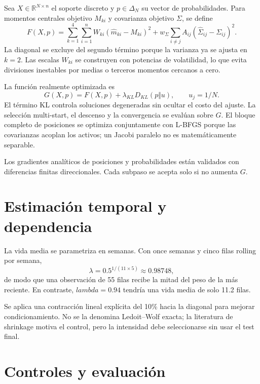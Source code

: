 \documentclass[11pt,letterpaper]{article}
\begin{document}
Sea $X\in\mathbb{R}^{N\times n}$ el soporte discreto y
$p\in\Delta_N$ su vector de probabilidades. Para momentos centrales objetivo
$M_{ki}$ y covarianza objetivo $\Sigma$, se define
\begin{equation}
 F(X,p)=\sum_{k=1}^{4}\sum_{i=1}^{n}W_{ki}
 \left(\widehat m_{ki}-M_{ki}\right)^2
 +w_\Sigma\sum_{i\ne j}A_{ij}
 \left(\widehat\Sigma_{ij}-\Sigma_{ij}\right)^2.
\end{equation}
La diagonal se excluye del segundo término porque la varianza ya se ajusta en
$k=2$. Las escalas $W_{ki}$ se construyen con potencias de volatilidad, lo que evita
divisiones inestables por medias o terceros momentos cercanos a cero.

La función realmente optimizada es
\begin{equation}
 G(X,p)=F(X,p)+\lambda_{KL}D_{KL}(p\Vert u),
 \qquad u_j=1/N.
\end{equation}
El término KL controla soluciones degeneradas sin ocultar el costo del ajuste. La
selección multi-start, el descenso y la convergencia se evalúan sobre $G$. El bloque
completo de posiciones se optimiza conjuntamente con L-BFGS porque las covarianzas
acoplan los activos; un Jacobi paralelo no es matemáticamente separable.

Los gradientes analíticos de posiciones y probabilidades están validados con
diferencias finitas direccionales. Cada subpaso se acepta solo si no aumenta $G$.

\section{Estimación temporal y dependencia}

La vida media se parametriza en semanas. Con once semanas y cinco filas rolling por
semana,
\begin{equation}
 \lambda=0.5^{1/(11\times5)}\approx0.98748,
\end{equation}
de modo que una observación de 55 filas recibe la mitad del peso de la más reciente.
En contraste, $lambda=0.94$ tendría una vida media de solo 11.2 filas.

Se aplica una contracción lineal explícita del 10\% hacia la diagonal para mejorar
condicionamiento. No se la denomina Ledoit--Wolf exacta; la literatura de shrinkage
\cite{ledoitwolf2004} motiva el control, pero la intensidad debe seleccionarse sin
usar el test final.

\section{\texorpdfstring{\enspace}{}Controles y evaluación}
\end{document}
